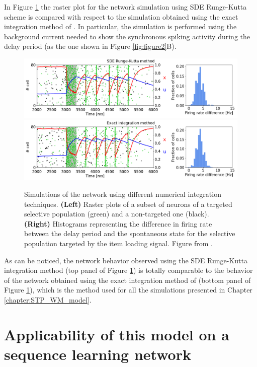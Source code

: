 \documentclass[a4paper, 12pt, twoside, openright]{book}
\begin{document}
In Figure \ref{fig:figure2b_different_integration} the raster plot for the network simulation using SDE Runge-Kutta scheme is compared with respect to the simulation obtained using the exact integration method of \cite{Rotter1999}. In particular, the simulation is performed using the background current needed to show the synchronous spiking activity during the delay period (as the one shown in Figure \ref{fig:figure2}B).

\begin{figure}[h]
    \centering
    \includegraphics[width=0.9\columnwidth]{figures/fig2_SDE_RK.png}
    \includegraphics[width=0.9\columnwidth]{figures/fig2_rotter99.png}
    \caption{Simulations of the network using different numerical integration techniques. \textbf{(Left)} Raster plots of a subset of neurons of a targeted selective population (green) and a non-targeted one (black). \textbf{(Right)} Histograms representing the difference in firing rate between the delay period and the spontaneous state for the selective population targeted by the item loading signal. Figure from \cite{Tiddia2022_WM}.}
    \label{fig:figure2b_different_integration}
\end{figure}

As can be noticed, the network behavior observed using the SDE Runge-Kutta integration method (top panel of Figure \ref{fig:figure2b_different_integration}) is totally comparable to the behavior of the network obtained using the exact integration method of \cite{Rotter1999} (bottom panel of Figure \ref{fig:figure2b_different_integration}), which is the method used for all the simulations presented in Chapter \ref{chapter:STP_WM_model}.


\section{Applicability of this model on a sequence learning network}
\end{document}
